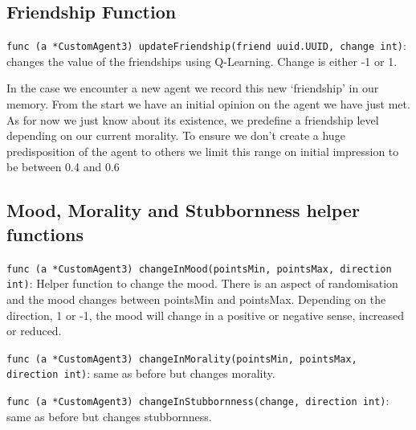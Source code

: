 \subsection{Friendship Function}
\begin{sloppypar} %
\texttt{func (a *CustomAgent3) updateFriendship(friend uuid.UUID, change int)}: changes the value of the friendships using Q-Learning. Change is either -1 or 1. \par
\end{sloppypar}
In the case we encounter a new agent we record this new ‘friendship’ in our memory. From the start we have an initial opinion on the agent we have just met. As for now we just know about its existence, we predefine a friendship level depending on our current morality. To ensure we don’t create a huge predisposition of the agent to others we limit this range on initial impression to be between 0.4 and 0.6

\subsection{Mood, Morality and Stubbornness helper functions }
\texttt{func (a *CustomAgent3) changeInMood(pointsMin, pointsMax, direction int)}: Helper function to change the mood. There is an aspect of randomisation and the mood changes between pointsMin and pointsMax. Depending on the direction, 1 or -1, the mood will change in a positive or negative sense, increased or reduced. \par
\begin{sloppypar} %
\texttt{func (a *CustomAgent3) changeInMorality(pointsMin, pointsMax, direction int)}: same as before but changes morality. \par
\end{sloppypar}
\texttt{func (a *CustomAgent3) changeInStubbornness(change, direction int)}: same as before but changes stubbornness. \par

